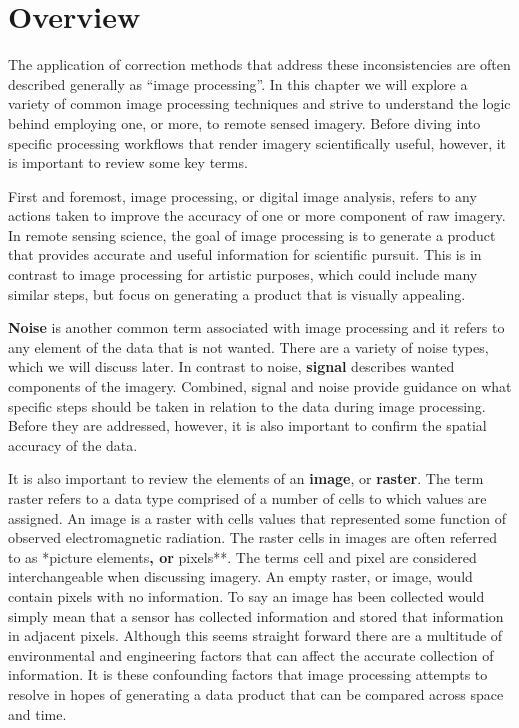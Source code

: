 \documentclass[
]{book}
\begin{document}
\hypertarget{overview}{%
\section{Overview}\label{overview}}

The application of correction methods that address these inconsistencies are often described generally as ``image processing''. In this chapter we will explore a variety of common image processing techniques and strive to understand the logic behind employing one, or more, to remote sensed imagery. Before diving into specific processing workflows that render imagery scientifically useful, however, it is important to review some key terms.

First and foremost, image processing, or digital image analysis, refers to any actions taken to improve the accuracy of one or more component of raw imagery. In remote sensing science, the goal of image processing is to generate a product that provides accurate and useful information for scientific pursuit. This is in contrast to image processing for artistic purposes, which could include many similar steps, but focus on generating a product that is visually appealing.

\textbf{Noise} is another common term associated with image processing and it refers to any element of the data that is not wanted. There are a variety of noise types, which we will discuss later. In contrast to noise, \textbf{signal} describes wanted components of the imagery. Combined, signal and noise provide guidance on what specific steps should be taken in relation to the data during image processing. Before they are addressed, however, it is also important to confirm the spatial accuracy of the data.

It is also important to review the elements of an \textbf{image}, or \textbf{raster}. The term raster refers to a data type comprised of a number of cells to which values are assigned. An image is a raster with cells values that represented some function of observed electromagnetic radiation. The raster cells in images are often referred to as *picture elements\textbf{, or }pixels**. The terms cell and pixel are considered interchangeable when discussing imagery. An empty raster, or image, would contain pixels with no information. To say an image has been collected would simply mean that a sensor has collected information and stored that information in adjacent pixels. Although this seems straight forward there are a multitude of environmental and engineering factors that can affect the accurate collection of information. It is these confounding factors that image processing attempts to resolve in hopes of generating a data product that can be compared across space and time.
\end{document}
